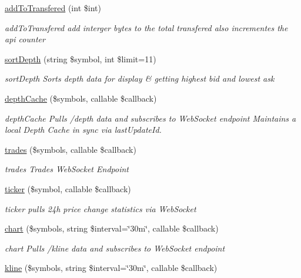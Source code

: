 \begin{DoxyCompactItemize}
\hyperlink{classBinance_1_1API_a90daef87526a753473580139c04d311b}{add\-To\-Transfered} (int \$int)
\begin{DoxyCompactList}\small\item\em add\-To\-Transfered add interger bytes to the total transfered also incrementes the api counter \end{DoxyCompactList}\item 
\hyperlink{classBinance_1_1API_a61742a5bdff7fc2119ab8b797c0cef4e}{sort\-Depth} (string \$symbol, int \$limit=11)
\begin{DoxyCompactList}\small\item\em sort\-Depth Sorts depth data for display \& getting highest bid and lowest ask \end{DoxyCompactList}\item 
\hyperlink{classBinance_1_1API_a179ddfeb9d6469f43f56f4415e226ca0}{depth\-Cache} (\$symbols, callable \$callback)
\begin{DoxyCompactList}\small\item\em depth\-Cache Pulls /depth data and subscribes to  Web\-Socket endpoint Maintains a local Depth Cache in sync via last\-Update\-Id. \end{DoxyCompactList}\item 
\hyperlink{classBinance_1_1API_a77611c0cbe2d55dc04239274769e2de9}{trades} (\$symbols, callable \$callback)
\begin{DoxyCompactList}\small\item\em trades Trades Web\-Socket Endpoint \end{DoxyCompactList}\item 
\hyperlink{classBinance_1_1API_a67bb7518406ed697a1e476f22ed78bf6}{ticker} (\$symbol, callable \$callback)
\begin{DoxyCompactList}\small\item\em ticker pulls 24h price change statistics via Web\-Socket \end{DoxyCompactList}\item 
\hyperlink{classBinance_1_1API_a2d4a65cde999da48f82c29e989133ac3}{chart} (\$symbols, string \$interval=\char`\"{}30m\char`\"{}, callable \$callback)
\begin{DoxyCompactList}\small\item\em chart Pulls /kline data and subscribes to  Web\-Socket endpoint \end{DoxyCompactList}\item 
\hyperlink{classBinance_1_1API_a33e3e2b84393ad729ce3639004970254}{kline} (\$symbols, string \$interval=\char`\"{}30m\char`\"{}, callable \$callback)

\end{DoxyCompactItemize}
